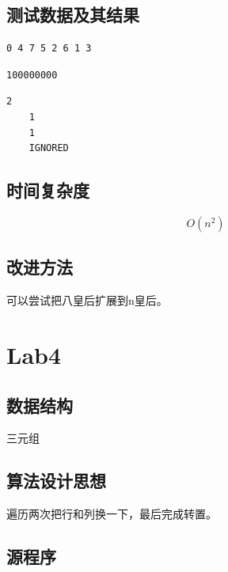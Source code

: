 \documentclass[a4paper,11pt,UTF8]{ctexart}
\begin{document}






\subsection{测试数据及其结果}

\begin{lstlisting}[caption=3Eight\_Queens.cpp,captionpos=b]
    0 4 7 5 2 6 1 3
\end{lstlisting}

\begin{lstlisting}[caption=4CSP.cpp,captionpos=b]
    100000000
\end{lstlisting}

\begin{lstlisting}[caption=5CSP.cpp,captionpos=b]
    2
    1
    1
    IGNORED
\end{lstlisting}

\subsection{时间复杂度}
$$O(n^2)$$
\subsection{改进方法}
可以尝试把八皇后扩展到n皇后。


\section{Lab4}
\subsection{数据结构}
三元组
\subsection{算法设计思想}
遍历两次把行和列换一下，最后完成转置。
\subsection{源程序}





\end{document}
